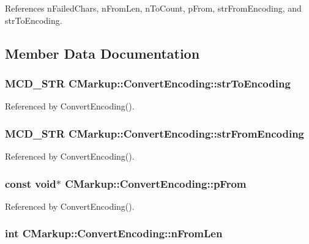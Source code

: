References nFailedChars, nFromLen, nToCount, pFrom, strFromEncoding, and strToEncoding.

\subsection{Member Data Documentation}
\subsubsection[strToEncoding]{\setlength{\rightskip}{0pt plus 5cm}MCD\_\-STR {\bf CMarkup::ConvertEncoding::strToEncoding}}\label{structCMarkup_1_1ConvertEncoding_cc2420305e7cfa6c9d18f7ce9daa4313}




Referenced by ConvertEncoding().
\subsubsection[strFromEncoding]{\setlength{\rightskip}{0pt plus 5cm}MCD\_\-STR {\bf CMarkup::ConvertEncoding::strFromEncoding}}\label{structCMarkup_1_1ConvertEncoding_8ab5d602610c46eb26d0fbf8a39b2da8}




Referenced by ConvertEncoding().
\subsubsection[pFrom]{\setlength{\rightskip}{0pt plus 5cm}const void$\ast$ {\bf CMarkup::ConvertEncoding::pFrom}}\label{structCMarkup_1_1ConvertEncoding_9647b6f60d353bd8af2ff462ff451b4d}




Referenced by ConvertEncoding().
\subsubsection[nFromLen]{\setlength{\rightskip}{0pt plus 5cm}int {\bf CMarkup::ConvertEncoding::nFromLen}}\label{structCMarkup_1_1ConvertEncoding_4b5e6d28cc2e909e2ac0d164cd00d53c}




